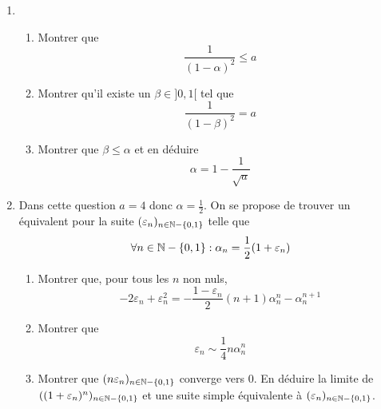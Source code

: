 \begin{enumerate}
\item \begin{enumerate}
 \item Montrer que 
\begin{displaymath}
 \dfrac{1}{(1-\alpha)^2}\leq a
\end{displaymath}
\item Montrer qu'il existe un $\beta \in ]0,1[$ tel que
\begin{displaymath}
 \dfrac{1}{(1-\beta)^2} = a
\end{displaymath}
\item Montrer que $\beta\leq \alpha$ et en déduire 
\begin{displaymath}
 \alpha = 1 - \dfrac{1}{\sqrt{a}}
\end{displaymath}
\end{enumerate}
\item Dans cette question $a=4$ donc $\alpha=\frac{1}{2}$. On se propose de trouver un équivalent pour la suite $(\varepsilon_n)_{n\in \mathbb{N}-\{0,1\}}$ telle que 
\begin{displaymath}
 \forall n \in \mathbb{N}-\{0,1\} : \alpha_n = \dfrac{1}{2}(1+\varepsilon_n)
\end{displaymath}
\begin{enumerate}
 \item Montrer que, pour tous les $n$ non nuls,
\begin{displaymath}
 -2\varepsilon_n + \varepsilon_n^2 = -\dfrac{1-\varepsilon_n}{2}(n+1)\alpha_n^n - \alpha_n^{n+1}
\end{displaymath}
\item Montrer que
\begin{displaymath}
 \varepsilon_n \sim \dfrac{1}{4}n\alpha_n^n
\end{displaymath}
\item Montrer que $(n\varepsilon_n)_{n\in \mathbb{N}-\{0,1\}}$ converge vers $0$.\newline
En déduire la limite de $((1+\varepsilon_n)^n)_{n\in \mathbb{N}-\{0,1\}}$ et une suite simple équivalente à $(\varepsilon_n)_{n\in \mathbb{N}-\{0,1\}}$.
\end{enumerate}

\end{enumerate}

